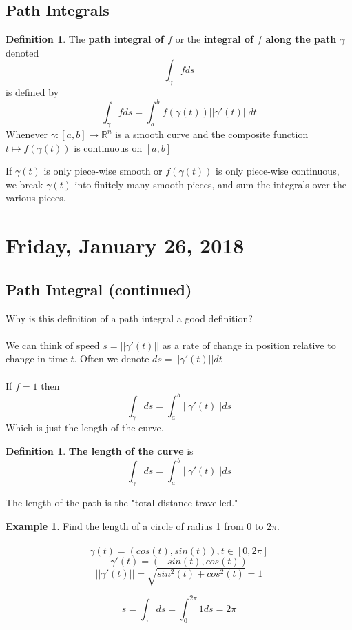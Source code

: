 \documentclass[12pt]{article}
\theoremstyle{plain}
\theoremstyle{definition}
\newtheorem{definition}[theorem]{Definition}
\newtheorem{example}[theorem]{Example}
\begin{document}
\subsection{Path Integrals}

\begin{definition}
	The \textbf{path integral of $f$} or the \textbf{integral of $f$ along the path $\gamma$} denoted
	$$\int_\gamma f ds$$
	is defined by
	$$\int_\gamma f ds = \int^b_a f(\gamma(t)) ||\gamma ' (t) || dt$$
	Whenever $\gamma: [a,b]\mapsto \mathbb{R}^n$ is a smooth curve and the composite function $t \mapsto f(\gamma(t))$ is continuous on $[a,b]$
\end{definition}

If $\gamma (t)$ is only piece-wise smooth or $f(\gamma (t))$ is only piece-wise continuous, we break $\gamma (t)$ into finitely many smooth pieces, and sum the integrals over the various pieces.

\section{Friday, January 26, 2018}

\subsection{Path Integral (continued)}

Why is this definition of a path integral a good definition?\\
\\
We can think of speed $s=||\gamma ' (t)||$ as a rate of change in position relative to change in time $t$. Often we denote $ds=||\gamma ' (t)||dt$\\
\\
If $f=1$ then
$$\int_\gamma ds = \int_a^b ||\gamma ' (t)|| ds$$
Which is just the length of the curve.

\begin{definition}
	\textbf{The length of the curve} is $$\int_\gamma ds = \int_a^b ||\gamma ' (t)|| ds$$
\end{definition}

The length of the path is the "total distance travelled."

\begin{example}
	Find the length of a circle of radius 1 from 0 to $2\pi$.\\
	\\
	$$\gamma (t) = (cos(t), sin(t)), t\in [0, 2\pi]$$
	$$\gamma ' (t) = (-sin(t), cos(t))$$
	$$||\gamma ' (t)|| = \sqrt{sin^2(t) + cos^2(t)} = 1$$


	$$s = \int_\gamma ds = \int_0^{2\pi} 1 ds = 2\pi$$
\end{example}
\end{document}
